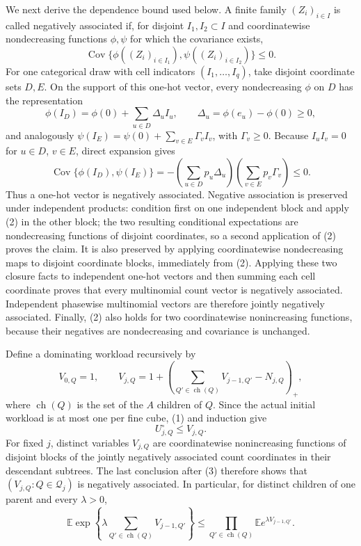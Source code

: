 We next derive the dependence bound used below.  A finite family \((Z_i)_{i\in I}\) is called negatively associated if, for disjoint \(I_1,I_2\subset I\) and coordinatewise nondecreasing functions \(\phi,\psi\) for which the covariance exists,
\[
 \operatorname{Cov}\{\phi((Z_i)_{i\in I_1}),\psi((Z_i)_{i\in I_2})\}\le0. \tag{2}
\]
For one categorical draw with cell indicators \((I_1,\ldots,I_q)\), take disjoint coordinate sets \(D,E\).  On the support of this one-hot vector, every nondecreasing \(\phi\) on \(D\) has the representation
\[
 \phi(I_D)=\phi(0)+\sum_{u\in D}\Delta_u I_u,
 \qquad \Delta_u=\phi(e_u)-\phi(0)\ge0,
\]
and analogously \(\psi(I_E)=\psi(0)+\sum_{v\in E}\Gamma_vI_v\), with \(\Gamma_v\ge0\).  Because \(I_uI_v=0\) for \(u\in D\), \(v\in E\), direct expansion gives
\[
 \operatorname{Cov}\{\phi(I_D),\psi(I_E)\}
 =-\left(\sum_{u\in D}p_u\Delta_u\right)
   \left(\sum_{v\in E}p_v\Gamma_v\right)\le0. \tag{3}
\]
Thus a one-hot vector is negatively associated.  Negative association is preserved under independent products: condition first on one independent block and apply (2) in the other block; the two resulting conditional expectations are nondecreasing functions of disjoint coordinates, so a second application of (2) proves the claim.  It is also preserved by applying coordinatewise nondecreasing maps to disjoint coordinate blocks, immediately from (2).  Applying these two closure facts to independent one-hot vectors and then summing each cell coordinate proves that every multinomial count vector is negatively associated.  Independent phasewise multinomial vectors are therefore jointly negatively associated.  Finally, (2) also holds for two coordinatewise nonincreasing functions, because their negatives are nondecreasing and covariance is unchanged.

Define a dominating workload recursively by
\[
 V_{0,Q}=1,\qquad
 V_{j,Q}=1+\left(\sum_{Q'\in\operatorname{ch}(Q)}V_{j-1,Q'}-N_{j,Q}\right)_+ , \tag{4}
\]
where \(\operatorname{ch}(Q)\) is the set of the \(A\) children of \(Q\).  Since the actual initial workload is at most one per fine cube, (1) and induction give
\[
 U^\circ_{j,Q}\le V_{j,Q}. \tag{5}
\]
For fixed \(j\), distinct variables \(V_{j,Q}\) are coordinatewise nonincreasing functions of disjoint blocks of the jointly negatively associated count coordinates in their descendant subtrees.  The last conclusion after (3) therefore shows that \((V_{j,Q}:Q\in\mathcal Q_j)\) is negatively associated.  In particular, for distinct children of one parent and every \(\lambda>0\),
\[
 \mathbb E\exp\!\left\{\lambda\sum_{Q'\in\operatorname{ch}(Q)}V_{j-1,Q'}\right\}
 \le\prod_{Q'\in\operatorname{ch}(Q)}\mathbb E e^{\lambda V_{j-1,Q'}}. \tag{6}
\]

